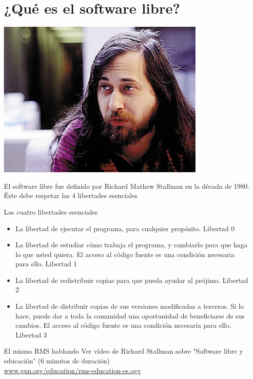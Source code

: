 \documentclass{beamer}
\begin{document}
\section{¿Qué es el software libre?}
\begin{frame}
\begin{center}
\includegraphics[scale=.5]{Richard_Matthew_Stallman.jpeg} 
\end{center}
El software libre fue definido por Richard Mathew Stallman en la década de 1980. Éste debe respetar las 4 libertades esenciales \cite{gnu}
\end{frame} 
\begin{frame}{Las cuatro libertades esenciales}
\begin{itemize}
  \item La libertad de ejecutar el programa, para cualquier propósito. \alert{Libertad 0}
  \pause
  \item La libertad de estudiar cómo trabaja el programa, y cambiarlo para que haga lo que usted quiera. El acceso al código fuente es una condición necesaria para ello. \alert{Libertad 1}
  \pause
  \item La libertad de redistribuir copias para que pueda ayudar al prójimo. \alert{Libertad 2}
  \pause
  \item La libertad de distribuir copias de sus versiones modificadas a terceros. Si lo hace, puede dar a toda la comunidad una oportunidad de beneficiarse de sus cambios. El acceso al código fuente es una condición necesaria para ello. \alert{Libertad 3}
  \end{itemize}
\end{frame}
\begin{frame}{El mismo RMS hablando}
Ver vídeo de Richard Stallman sobre "Software libre y educación" (6 minutos de duración)\\
\url{www.gnu.org/education/rms-education-es.ogv}\cite{rms}
\end{frame}
\end{document}
